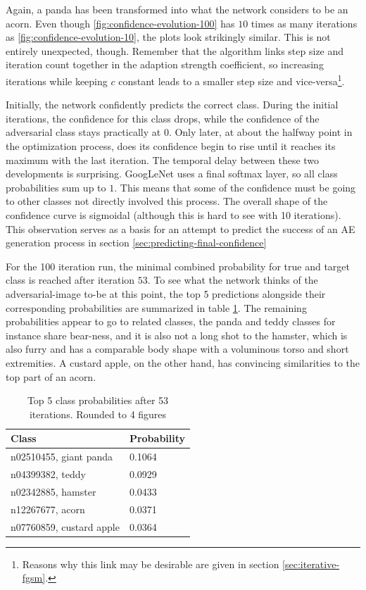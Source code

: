 \documentclass[11pt, a4paper]{article}
\begin{document}
Again, a panda has been transformed into what the network considers to be an acorn. Even though \ref{fig:confidence-evolution-100} has $10$ times as many iterations as \ref{fig:confidence-evolution-10}, the plots look strikingly similar. This is not entirely unexpected, though. Remember that the algorithm links step size and iteration count together in the adaption strength coefficient, so increasing iterations while keeping $c$ constant leads to a smaller step size and vice-versa\footnote{Reasons why this link may be desirable are given in section \ref{sec:iterative-fgsm}.}.

Initially, the network confidently predicts the correct class. During the initial iterations, the confidence for this class drops, while the confidence of the adversarial class stays practically at $0$. Only later, at about the halfway point in the optimization process, does its confidence begin to rise until it reaches its maximum with the last iteration. The temporal delay between these two developments is surprising. GoogLeNet uses a final softmax layer, so all class probabilities sum up to $1$. This means that some of the confidence must be going to other classes not directly involved this process. The overall shape of the confidence curve is sigmoidal (although this is hard to see with 10 iterations). This observation serves as a basis for an attempt to predict the success of an AE generation process in section \ref{sec:predicting-final-confidence}

For the 100 iteration run, the minimal combined probability for true and target class is reached after iteration $53$. To see what the network thinks of the adversarial-image to-be at this point, the top 5 predictions alongside their corresponding probabilities are summarized in table \ref{tab:ae-intermediate}. The remaining probabilities appear to go to related classes, the panda and teddy classes for instance share bear-ness, and it is also not a long shot to the hamster, which is also furry and has a comparable body shape with a voluminous torso and short extremities. A custard apple, on the other hand, has convincing similarities to the top part of an acorn.

\begin{table}[h!tb]
	\centering
	\begin{tabular}{|l|l|}
		\hline
		Class & Probability \\
		\hline
		n02510455, giant panda & 0.1064 \\
		n04399382, teddy & 0.0929 \\
		n02342885, hamster & 0.0433 \\
		n12267677, acorn & 0.0371 \\
		n07760859, custard apple & 0.0364 \\
		\hline
	\end{tabular}
	\caption[Top 5 class probabilities in the middle of iterative FGSM]{Top 5 class probabilities after 53 iterations. Rounded to 4 figures}
	\label{tab:ae-intermediate}
\end{table}
\end{document}
